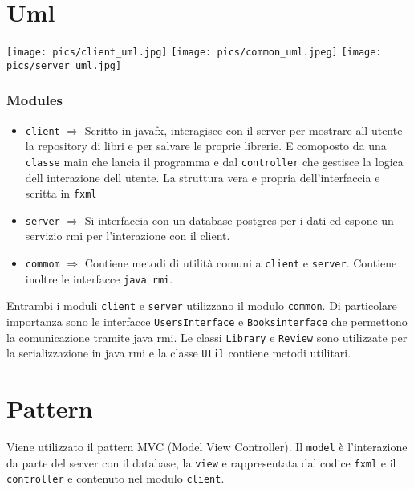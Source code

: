\documentclass{report}
\begin{document}
\chapter{Uml}
\texttt{[image: pics/client\_uml.jpg]}
\texttt{[image: pics/common\_uml.jpeg]} 
\texttt{[image: pics/server\_uml.jpg]} 
\subsection{Modules}
\begin{itemize}
    \item \verb+client+ $ \Rightarrow $ Scritto in javafx, interagisce con il server per mostrare all utente la repository di libri e per salvare le proprie librerie. E comoposto da una \verb+classe+ main che lancia il programma e dal \verb+controller+ che gestisce la logica dell interazione dell utente. La struttura vera e propria dell'interfaccia e scritta in \verb+fxml+
    \item \verb+server+ $ \Rightarrow $ Si interfaccia con un database postgres per i dati ed espone un servizio rmi per l'interazione con il client.
    \item \verb+commom+ $ \Rightarrow $ Contiene metodi di utilità comuni a \verb+client+ e \verb+server+. Contiene inoltre le interfacce \verb+java rmi+.
\end{itemize}
Entrambi i moduli \verb+client+ e \verb+server+ utilizzano il modulo \verb+common+. Di particolare importanza sono le interfacce \verb+UsersInterface+ e \verb+Booksinterface+ che permettono la comunicazione tramite java rmi. Le classi \verb+Library+ e \verb+Review+ sono utilizzate per la serializzazione in java rmi e la classe \verb+Util+ contiene metodi utilitari.

\chapter{Pattern}
Viene utilizzato il pattern MVC (Model View Controller). Il \verb+model+ è l'interazione da parte del server con il database, la \verb+view+ e rappresentata dal codice \verb+fxml+ e il \verb+controller+ e contenuto nel modulo \verb+client+. 
\end{document}
